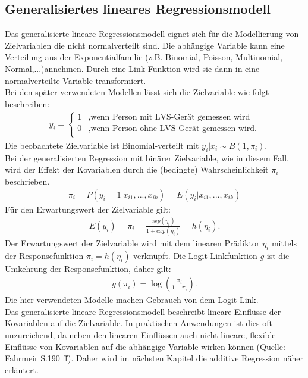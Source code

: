 \subsection{Generalisiertes lineares Regressionsmodell}
Das generalisierte lineare Regressionsmodell eignet sich für die Modellierung von Zielvariablen die nicht normalverteilt sind. Die abhängige Variable kann eine Verteilung aus der Exponentialfamilie (z.B. Binomial, Poisson, Multinomial, Normal,...)annehmen. Durch eine Link-Funktion wird sie dann in eine normalverteilte Variable transformiert. \\
Bei den später verwendeten Modellen lässt sich die Zielvariable wie folgt beschreiben: \\
\begin{align}
y_{i}=\begin{cases}
1 & \text{,wenn Person mit LVS-Gerät gemessen wird } \\
0 & \text{,wenn Person ohne LVS-Gerät gemessen wird.} \\
\end{cases}
\end{align}
Die beobachtete Zielvariable ist Binomial-verteilt mit $y_{i}|x_{i}\sim B(1,\pi_{i})$. \\

Bei der generalisierten Regression mit binärer Zielvariable, wie in diesem Fall, wird der Effekt der Kovariablen durch die (bedingte) Wahrscheinlichkeit $\pi_{i}$ beschrieben.
\begin{align}
\pi_{i}=P(y_{i}=1|x_{i1},...,x_{ik})=E(y_{i}|x_{i1},...,x_{ik})
\end{align}
Für den Erwartungswert der Zielvariable gilt:
\begin{align}
E(y_{i})=\pi_{i}=\frac{exp(\eta_{i})}{1+exp(\eta_{i})}=h(\eta_{i}).
\end{align}
Der Erwartungswert der Zielvariable wird mit dem linearen Prädiktor $\eta_{i}$ mittels der Responsefunktion $\pi_{i}=h(\eta_{i})$ verknüpft. Die Logit-Linkfunktion $g$ ist die Umkehrung der Responsefunktion, daher gilt:
\begin{align}
g(\pi_{i})=\log(\frac{\pi_{i}}{1-\pi_{i}}).
\end{align}
Die hier verwendeten Modelle machen Gebrauch von dem Logit-Link. \\
Das generalisierte lineare Regressionsmodell beschreibt lineare Einflüsse der Kovariablen auf die Zielvariable. In praktischen Anwendungen ist dies oft unzureichend, da neben den linearen Einflüssen auch nicht-lineare, flexible Einflüsse von Kovariablen auf die abhängige Variable wirken können (Quelle: Fahrmeir S.190 ff). Daher wird im nächsten Kapitel die additive Regression näher erläutert.

